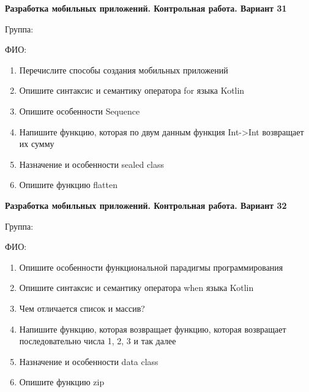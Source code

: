 \documentclass[12pt]{article}
\begin{document}
\newpage\begin{minipage}{\textwidth}
\textbf{Разработка мобильных приложений. Контрольная работа. Вариант 31}

Группа: \underline{\hspace{3cm}}

ФИО: \underline{\hspace{10cm}}

\begin{enumerate}
\item Перечислите способы создания мобильных приложений
\item Опишите синтаксис и семантику оператора for языка Kotlin
\item Опишите особенности Sequence
\item Напишите функцию, которая по двум данным функция Int->Int возвращает их сумму
\item Назначение и особенности sealed class
\item Опишите функцию flatten

\end{enumerate}
\end{minipage}

\newpage\begin{minipage}{\textwidth}
\textbf{Разработка мобильных приложений. Контрольная работа. Вариант 32}

Группа: \underline{\hspace{3cm}}

ФИО: \underline{\hspace{10cm}}

\begin{enumerate}
\item Опишите особенности функциональной парадигмы программирования
\item Опишите синтаксис и семантику оператора when языка Kotlin
\item Чем отличается список и массив?
\item Напишите функцию, которая возвращает функцию, которая возвращает последовательно числа 1, 2, 3 и так далее
\item Назначение и особенности data class
\item Опишите функцию zip

\end{enumerate}
\end{minipage}
\end{document}
